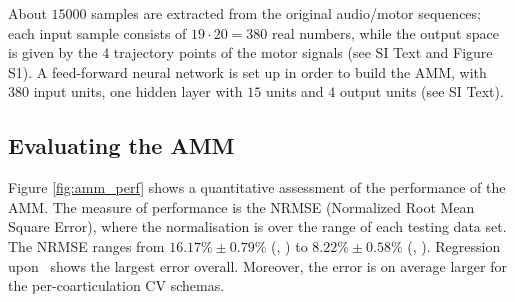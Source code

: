 About $15000$ samples are extracted from the original audio/motor sequences; 
each input sample consists of $19\cdot 20 = 380$ real
numbers, while the output space is given by the $4$ trajectory points of
the motor signals (see SI Text and Figure S1).
A feed-forward neural network is set up in order to
build the AMM, with $380$ input units, one hidden layer with $15$ units and
$4$ output units (see SI Text).



\subsection{Evaluating the AMM}
\label{subsec:amm_results}

Figure \ref{fig:amm_perf} shows a quantitative assessment of the performance
of the AMM. The measure of performance is the NRMSE (Normalized Root Mean Square Error),
where the normalisation is over the range of each testing data set. The NRMSE
ranges from $16.17\% \pm 0.79\%$ (\vlio, \coa) to $8.22\% \pm 0.58\%$ (\vttu, \spkc).
Regression upon \vlio\ shows the largest error overall. Moreover, the error is on average
larger for the per-coarticulation CV schemas.

